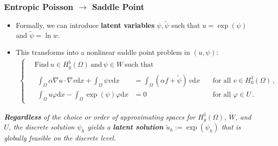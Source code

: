 \documentclass[aspectratio=169,xcolor=dvipsnames,11pt]{beamer}
\newcommand{\dd}{\mathrm{d}}
\newcommand{\fa}{\text{for all }}
\begin{document}
\begin{frame}\frametitle{Entropic Poisson $\rightarrow$ Saddle Point}
\begin{itemize}
\item
Formally, we can introduce \textbf{latent variables} $\psi, \widetilde{\psi}$ such that $u = \exp(\psi)$ and $\widetilde{\psi} = \ln w$. \pause
\item This transforms \label{eq:EPEIntro} into a nonlinear saddle point problem in $(u,\psi)$:
		\begin{gather*}
			\left\{
			\begin{aligned}
				\,&\text{Find}~
				u\in H^1_g(\Omega) ~\text{and}~\psi \in W
				~\text{such that~}
				\\
				&\begin{alignedat}{4}
					\int_\Omega \alpha \nabla u\cdot \nabla v \dd x + \int_\Omega \psi v \dd x &= \int_\Omega (\alpha f + \widetilde{\psi})\, v \dd x
					&&~\fa v \in H^1_0(\Omega)
					\,,
					\\
					\int_\Omega u \varphi \dd x - \int_\Omega \exp(\psi) \varphi \dd x &= 0
					&&~\fa \varphi \in U
					\,.
				\end{alignedat}
			\end{aligned}
			\right.
		\end{gather*} 
\end{itemize}\pause
\begin{center}
\textit{
\textbf{Regardless} of the choice or order of approximating spaces for $H^1_g(\Omega)$, $W$, and $U$, the discrete solution $\psi_h$ yields a \textbf{latent solution} $\widetilde{u}_h := \exp(\psi_h)$ 
that is globally feasible on the discrete level.
}
\end{center}
\end{frame}
\end{document}
